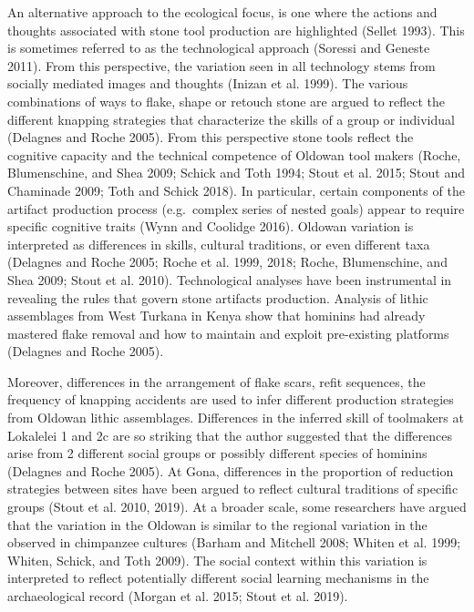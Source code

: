 \documentclass[]{elsarticle} %
\begin{document}
An alternative approach to the ecological focus, is one where the
actions and thoughts associated with stone tool production are
highlighted (Sellet 1993). This is sometimes referred to as the
technological approach (Soressi and Geneste 2011). From this
perspective, the variation seen in all technology stems from socially
mediated images and thoughts (Inizan et al. 1999). The various
combinations of ways to flake, shape or retouch stone are argued to
reflect the different knapping strategies that characterize the skills
of a group or individual (Delagnes and Roche 2005). From this
perspective stone tools reflect the cognitive capacity and the technical
competence of Oldowan tool makers (Roche, Blumenschine, and Shea 2009;
Schick and Toth 1994; Stout et al. 2015; Stout and Chaminade 2009; Toth
and Schick 2018). In particular, certain components of the artifact
production process (e.g.~complex series of nested goals) appear to
require specific cognitive traits (Wynn and Coolidge 2016). Oldowan
variation is interpreted as differences in skills, cultural traditions,
or even different taxa (Delagnes and Roche 2005; Roche et al. 1999,
2018; Roche, Blumenschine, and Shea 2009; Stout et al. 2010).
Technological analyses have been instrumental in revealing the rules
that govern stone artifacts production. Analysis of lithic assemblages
from West Turkana in Kenya show that hominins had already mastered flake
removal and how to maintain and exploit pre-existing platforms (Delagnes
and Roche 2005).

Moreover, differences in the arrangement of flake scars, refit
sequences, the frequency of knapping accidents are used to infer
different production strategies from Oldowan lithic assemblages.
Differences in the inferred skill of toolmakers at Lokalelei 1 and 2c
are so striking that the author suggested that the differences arise
from 2 different social groups or possibly different species of hominins
(Delagnes and Roche 2005). At Gona, differences in the proportion of
reduction strategies between sites have been argued to reflect cultural
traditions of specific groups (Stout et al. 2010, 2019). At a broader
scale, some researchers have argued that the variation in the Oldowan is
similar to the regional variation in the observed in chimpanzee cultures
(Barham and Mitchell 2008; Whiten et al. 1999; Whiten, Schick, and Toth
2009). The social context within this variation is interpreted to
reflect potentially different social learning mechanisms in the
archaeological record (Morgan et al. 2015; Stout et al. 2019).
\end{document}
